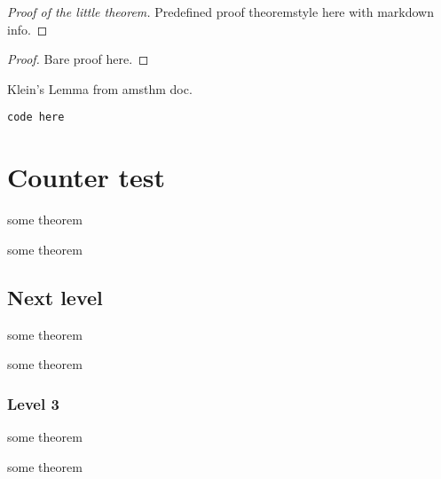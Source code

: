 \begin{proof}[Proof of the \emph{little} theorem]
Predefined proof theoremstyle here with markdown info.
\end{proof}

\begin{proof}
Bare proof here.
\end{proof}

\begin{KL}
Klein's Lemma from amsthm doc.
\end{KL}

\begin{Definition}
\begin{verbatim}
code here
\end{verbatim}
\end{Definition}

\hypertarget{counter-test}{%
\chapter{Counter test}\label{counter-test}}

\begin{Theorem}
some theorem
\end{Theorem}

\begin{Theorem}
some theorem
\end{Theorem}

\hypertarget{next-level}{%
\section{Next level}\label{next-level}}

\begin{Theorem}
some theorem
\end{Theorem}

\begin{Theorem}
some theorem
\end{Theorem}

\hypertarget{level-3}{%
\subsection{Level 3}\label{level-3}}

\begin{Theorem}
some theorem
\end{Theorem}

\begin{Theorem}
some theorem
\end{Theorem}

